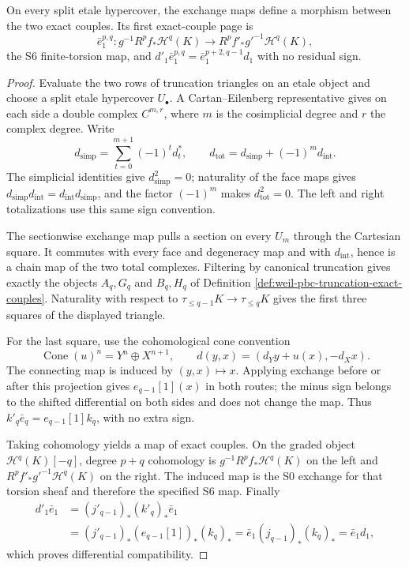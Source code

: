 \begin{lemma}
\label{lemma:weil-pbc-hypercover-exact-couple-map}
On every split etale hypercover, the exchange maps define a morphism between
the two exact couples.  Its first exact-couple page is
\[
\bar e_1^{p,q}:
g^{-1}R^pf_*\mathcal H^q(K)\longrightarrow
R^pf'_*g'^{-1}\mathcal H^q(K),
\]
the S6 finite-torsion map, and
$d'_1\bar e_1^{p,q}=\bar e_1^{p+2,q-1}d_1$ with no residual sign.
\end{lemma}
\begin{proof}

Evaluate the two rows of truncation triangles on an etale object and choose
a split etale hypercover $U_\bullet$.  A Cartan--Eilenberg representative
gives on each side a double complex $C^{m,r}$, where $m$ is the cosimplicial
degree and $r$ the complex degree.  Write
\[
d_{\mathrm{simp}}=\sum_{t=0}^{m+1}(-1)^t d_t^*,\qquad
d_{\mathrm{tot}}=d_{\mathrm{simp}}+(-1)^m d_{\mathrm{int}}.
\]
The simplicial identities give $d_{\mathrm{simp}}^2=0$; naturality of the
face maps gives
$d_{\mathrm{simp}}d_{\mathrm{int}}=
d_{\mathrm{int}}d_{\mathrm{simp}}$, and the factor $(-1)^m$ makes
$d_{\mathrm{tot}}^2=0$.  The left and right totalizations use this same
sign convention.

The sectionwise exchange map pulls a section on every $U_m$ through the
Cartesian square.  It commutes with every face and degeneracy map and with
$d_{\mathrm{int}}$, hence is a chain map of the two total complexes.
Filtering by canonical truncation gives exactly the objects
$A_q,G_q$ and $B_q,H_q$ of Definition
\ref{def:weil-pbc-truncation-exact-couples}.  Naturality with respect to
$\tau_{\leq q-1}K\to\tau_{\leq q}K$ gives the first three squares of the
displayed triangle.

For the last square, use the cohomological cone convention
\[
\operatorname{Cone}(u)^n=Y^n\oplus X^{n+1},\qquad
d(y,x)=(d_Yy+u(x),-d_Xx).
\]
The connecting map is induced by $(y,x)\mapsto x$.  Applying exchange
before or after this projection gives $e_{q-1}[1](x)$ in both routes; the
minus sign belongs to the shifted differential on both sides and does not
change the map.  Thus
$k'_q\bar e_q=e_{q-1}[1]k_q$, with no extra sign.

Taking cohomology yields a map of exact couples.  On the graded object
$\mathcal H^q(K)[-q]$, degree $p+q$ cohomology is
$g^{-1}R^pf_*\mathcal H^q(K)$ on the left and
$R^pf'_*g'^{-1}\mathcal H^q(K)$ on the right.  The induced map is the S0
exchange for that torsion sheaf and therefore the specified S6 map.  Finally
\[
\begin{aligned}
d'_1\bar e_1
 &=(j'_{q-1})_*(k'_q)_*\bar e_1\\
 &=(j'_{q-1})_*(e_{q-1}[1])_*(k_q)_*
 =\bar e_1(j_{q-1})_*(k_q)_*
 =\bar e_1d_1,
\end{aligned}
\]
which proves differential compatibility.
\end{proof}

